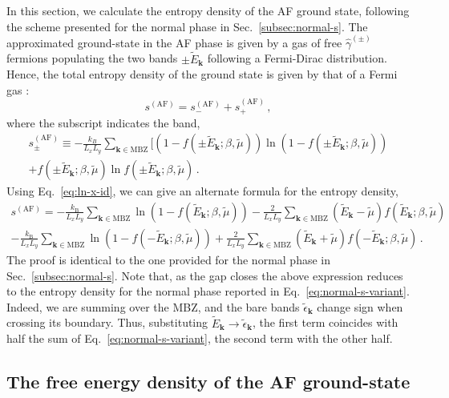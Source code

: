 In this section, we calculate the entropy density of the AF ground state, following the scheme presented for the normal phase in Sec.~\ref{subsec:normal-s}. The approximated ground-state in the AF phase is given by a gas of free $\hat \gamma^{(\pm)}$ fermions populating the two bands $\pm \tilde{E}_\mathbf{k}$ following a Fermi-Dirac distribution. Hence, the total entropy density of the ground state is given by that of a Fermi gas \cite{grosso2014solid}:
\[
s^{(\mathrm{AF})} = s_-^{(\mathrm{AF})} + s_+^{(\mathrm{AF})} \, ,
\]
where the subscript indicates the band,
\begin{multline}
	s_\pm^{(\mathrm{AF})} \equiv -\frac{k_B}{L_x L_y} \sum_{\mathbf{k}\in\mathrm{MBZ}} \Big[
	\left(
	1- f( \pm\tilde{E}_\mathbf{k}; \beta,\tilde{\mu})
	\right) \ln \left(
	1- f( \pm\tilde{E}_\mathbf{k}; \beta,\tilde{\mu})
	\right) \\
	+ f(
	\pm\tilde{E}_\mathbf{k}; \beta,\tilde{\mu})
	\ln f( \pm\tilde{E}_\mathbf{k}; \beta,\tilde{\mu}) \, . \label{eq:af-s}
\end{multline}
Using Eq.~\eqref{eq:ln-x-id}, we can give an alternate formula for the entropy density,
\begin{multline}
	s^{(\mathrm{AF})} = -\frac{k_\mathrm{B}}{L_x L_y} \sum_{\mathbf{k}\in\mathrm{MBZ}} \ln \left(
	1- f( \tilde{E}_\mathbf{k}; \beta,\tilde{\mu}) \right) - \frac{2}{L_x L_y} \sum_{\mathbf{k}\in\mathrm{MBZ}} (\tilde{E}_\mathbf{k}-\tilde{\mu}) f( \tilde{E}_\mathbf{k}; \beta,\tilde{\mu}) \\
	-\frac{k_\mathrm{B}}{L_x L_y} \sum_{\mathbf{k}\in\mathrm{MBZ}} \ln \left(
	1- f( -\tilde{E}_\mathbf{k}; \beta,\tilde{\mu}) \right) + \frac{2}{L_x L_y} \sum_{\mathbf{k}\in\mathrm{MBZ}} (\tilde{E}_\mathbf{k}+\tilde{\mu}) f( -\tilde{E}_\mathbf{k}; \beta,\tilde{\mu}) \, . \label{eq:af-s-variant}
\end{multline}
The proof is identical to the one provided for the normal phase in Sec.~\ref{subsec:normal-s}. Note that, as the gap closes the above expression reduces to the entropy density for the normal phase reported in Eq.~\eqref{eq:normal-s-variant}. Indeed, we are summing over the MBZ, and the bare bands $\tilde{\epsilon}_\mathbf{k}$ change sign when crossing its boundary. Thus, substituting $\tilde{E}_\mathbf{k} \to \tilde{\epsilon}_\mathbf{k}$, the first term coincides with half the sum of Eq.~\eqref{eq:normal-s-variant}, the second term with the other half.

\subsection{The free energy density of the AF ground-state}\label{subsec:af-f}

